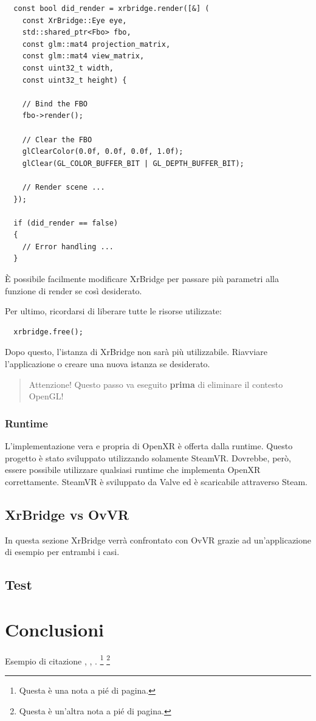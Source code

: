 \documentclass[twoside]{supsistudent}
\begin{document}
\begin{verbatim}
  const bool did_render = xrbridge.render([&] (
    const XrBridge::Eye eye,
    std::shared_ptr<Fbo> fbo,
    const glm::mat4 projection_matrix,
    const glm::mat4 view_matrix,
    const uint32_t width,
    const uint32_t height) {

    // Bind the FBO
    fbo->render();

    // Clear the FBO
    glClearColor(0.0f, 0.0f, 0.0f, 1.0f);
    glClear(GL_COLOR_BUFFER_BIT | GL_DEPTH_BUFFER_BIT);

    // Render scene ...
  });

  if (did_render == false)
  {
    // Error handling ...
  }
\end{verbatim}

È possibile facilmente modificare XrBridge per passare più parametri alla funzione di render se così desiderato.

Per ultimo, ricordarsi di liberare tutte le risorse utilizzate:

\begin{verbatim}
  xrbridge.free();
\end{verbatim}

Dopo questo, l'istanza di XrBridge non sarà più utilizzabile. Riavviare l'applicazione o creare una nuova istanza se desiderato.

\begin{quote}
  Attenzione! Questo passo va eseguito \textbf{prima} di eliminare il contesto OpenGL!
\end{quote}

\subsection{Runtime}

L'implementazione vera e propria di OpenXR è offerta dalla runtime. Questo progetto è stato sviluppato utilizzando solamente SteamVR. Dovrebbe, però, essere possibile utilizzare qualsiasi runtime che implementa OpenXR correttamente. SteamVR è sviluppato da Valve ed è scaricabile attraverso Steam.

\section{XrBridge vs OvVR}

In questa sezione XrBridge verrà confrontato con OvVR grazie ad un'applicazione di esempio per entrambi i casi.


\section{Test}

\chapter{Conclusioni}

\lipsum[23]
Esempio di citazione \cite{4538384}, \cite{5357331,4523385}, \cite{1705631}.
\footnote{Questa \`e una nota a pi\'e di pagina.}
\footnote{Questa \`e un'altra nota a pi\'e di pagina.}



\end{document}
